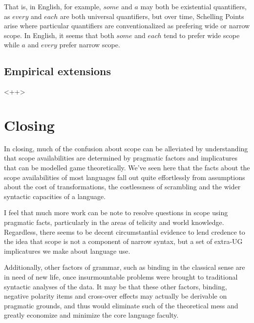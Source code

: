 \documentclass{article}
\begin{document}
That is, in English, for example, $some$ and $a$ may both be existential quantifiers, as $every$ and $each$ are both universal quantifiers, but over time, Schelling Points arise where particular quantifiers are conventionalized as prefering wide or narrow scope.
In English, it seems that both $some$ and $each$ tend to prefer wide scope while $a$ and $every$ prefer narrow scope.

\subsection{Empirical extensions}

<++>

\section{Closing}


In closing, much of the confusion about scope can be alleviated by understanding that scope availabilities are determined by pragmatic factors and implicatures that can be modelled game theoretically. We've seen here that the facts about the scope availabilities of most languages fall out quite effortlessly from assumptions about the cost of transformations, the costlessness of scrambling and the wider syntactic capacities of a language.

I feel that much more work can be note to resolve questions in scope using pragmatic facts, particularly in the areas of telicity and world knowledge. Regardless, there seems to be decent circumstantial evidence to lend credence to the idea that scope is not a component of narrow syntax, but a set of extra-UG implicatures we make about language use.

Additionally, other factors of grammar, such as binding in the classical sense are in need of new life, once insurmountable problems were brought to traditional syntactic analyses of the data. It may be that these other factors, binding, negative polarity items and cross-over effects may actually be derivable on pragmatic grounds, and thus would eliminate such of the theoretical mess and greatly economize and minimize the core language faculty.






\printbibliography
\end{document}
